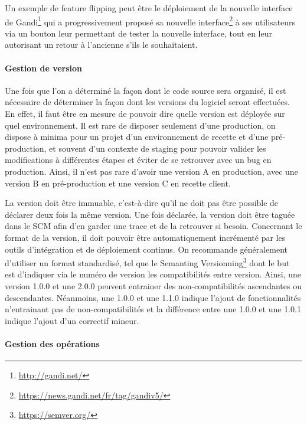 Un exemple de feature flipping peut être le déploiement de la nouvelle interface de Gandi\footnote{\url{http://gandi.net/}} qui a progressivement proposé sa nouvelle interface\footnote{\url{https://news.gandi.net/fr/tag/gandiv5/}} à ses utilisateurs via un bouton leur permettant de tester la nouvelle interface, tout en leur autorisant un retour à l'ancienne s'ils le souhaitaient. 

\paragraph{Gestion de version}\label{gestion-de-version}

Une fois que l'on a déterminé la façon dont le code source sera organisé, il est nécessaire de déterminer la façon dont les versions du logiciel seront effectuées. En effet, il faut être en mesure de pouvoir dire quelle version est déployée sur quel environnement. Il est rare de disposer seulement d'une production, on dispose à minima pour un projet d'un environnement de recette et d'une pré-production, et souvent d'un contexte de staging pour pouvoir valider les modifications à différentes étapes et éviter de se retrouver avec un bug en production. Ainsi, il n'est pas rare d'avoir une version A en production, avec une version B en pré-production et une version C en recette client.

La version doit être immuable, c'est-à-dire qu'il ne doit pas être possible de déclarer deux fois la même version. Une fois déclarée, la version doit être taguée dans le \gls{SCM} afin d'en garder une trace et de la retrouver si besoin. Concernant le format de la version, il doit pouvoir être automatiquement incrémenté par les outils d'intégration et de déploiement continus. On recommande généralement d'utiliser un format standardisé, tel que le Semanting Versionning\footnote{\url{https://semver.org/}} dont le but est d'indiquer via le numéro de version les compatibilités entre version. Ainsi, une version 1.0.0 et une 2.0.0 peuvent entrainer des non-compatibilités ascendantes ou descendantes. Néanmoins, une 1.0.0 et une 1.1.0 indique l'ajout de fonctionnalités n'entrainant pas de non-compatibilités et la différence entre une 1.0.0 et une 1.0.1 indique l'ajout d'un correctif mineur.

\paragraph{Gestion des opérations}

